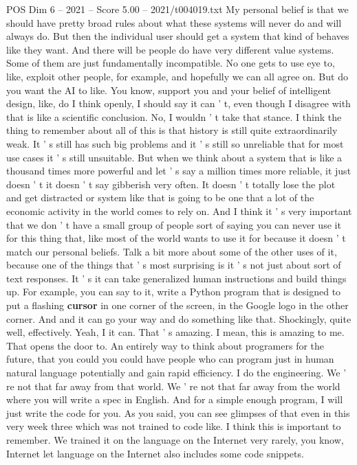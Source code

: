 \begin{textsample}{POS Dim 6 – 2021 – Score 5.00 – 2021/t004019.txt}
My personal belief is that we should have pretty broad rules about what these systems will never do and will always do.
But then the individual user should get a system that kind of behaves like they want.
And there will be people do have very different value systems.
Some of them are just fundamentally incompatible.
No one gets to use eye to, like, exploit other people, for example, and hopefully we can all agree on.
But do you want the AI to like.
You know, support you and your belief of intelligent design, like, do I think openly, I should say it can ' t, even though I disagree with that is like a scientific conclusion.
No, I wouldn ' t take that stance.
I think the thing to remember about all of this is that history is still quite extraordinarily weak.
It ' s still has such big problems and it ' s still so unreliable that for most use cases it ' s still unsuitable.
But when we think about a system that is like a thousand times more powerful and let ' s say a million times more reliable, it just doesn ' t it doesn ' t say gibberish very often.
It doesn ' t totally lose the plot and get distracted or system like that is going to be one that a lot of the economic activity in the world comes to rely on.
And I think it ' s very important that we don ' t have a small group of people sort of saying you can never use it for this thing that, like most of the world wants to use it for because it doesn ' t match our personal beliefs.
Talk a bit more about some of the other uses of it, because one of the things that ' s most surprising is it ' s not just about sort of text responses.
It ' s it can take generalized human instructions and build things up.
For example, you can say to it, write a Python program that is designed to put a flashing \textbf{cursor} in one corner of the screen, in the Google logo in the other corner.
And and it can go your way and do something like that.
Shockingly, quite well, effectively.
Yeah, I it can.
That ' s amazing.
I mean, this is amazing to me.
That opens the door to.
An entirely way to think about programers for the future, that you could you could have people who can program just in human natural language potentially and gain rapid efficiency.
I do the engineering.
We ' re not that far away from that world.
We ' re not that far away from the world where you will write a spec in English.
And for a simple enough program, I will just write the code for you.
As you said, you can see glimpses of that even in this very week three which was not trained to code like.
I think this is important to remember.
We trained it on the language on the Internet very rarely, you know, Internet let language on the Internet also includes some code snippets.

\end{textsample}
